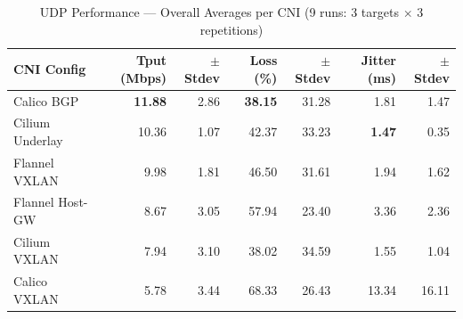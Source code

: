 \documentclass[11pt,a4paper]{article}
\begin{document}
\begin{table}[H]
\centering
\caption{UDP Performance --- Overall Averages per CNI (9 runs: 3 targets $\times$ 3 repetitions)}
\small
\begin{tabular}{lrrrrrr}
  \toprule
  \textbf{CNI Config} & \textbf{Tput (Mbps)} & \textbf{$\pm$Stdev} & \textbf{Loss (\%)} & \textbf{$\pm$Stdev} & \textbf{Jitter (ms)} & \textbf{$\pm$Stdev} \\
  \midrule
  Calico BGP        & \textbf{11.88} & 2.86 & \textbf{38.15} & 31.28 & 1.81 & 1.47 \\
  Cilium Underlay     & 10.36 & 1.07 & 42.37 & 33.23 & \textbf{1.47} & 0.35 \\
  Flannel VXLAN     & 9.98  & 1.81 & 46.50 & 31.61 & 1.94 & 1.62 \\
  Flannel Host-GW   & 8.67  & 3.05 & 57.94 & 23.40 & 3.36 & 2.36 \\
  Cilium VXLAN      & 7.94  & 3.10 & 38.02 & 34.59 & 1.55 & 1.04 \\
  Calico VXLAN      & 5.78  & 3.44 & 68.33 & 26.43 & 13.34 & 16.11 \\
  \bottomrule
\end{tabular}
\label{tab:bm-udp}
\end{table}

\begin{table}[H]
\centering
\caption{UDP Throughput (Mbps) and Loss (\%) by Bandwidth Target (3-run means)}
\small
{}
\label{tab:bm-udp-bw}
\end{table}
\end{document}
